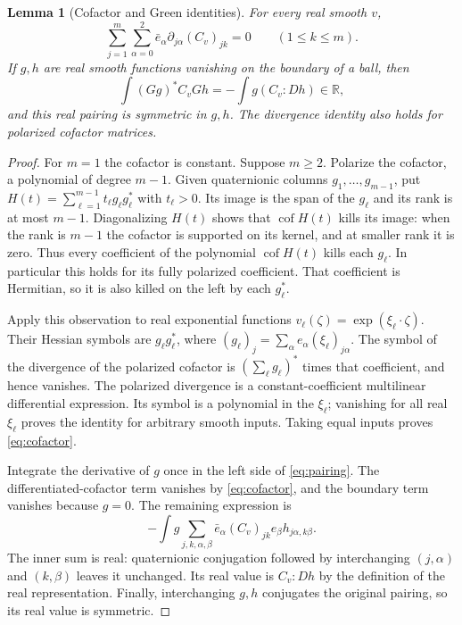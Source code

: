 \documentclass[11pt]{article}
\newtheorem{lemma}{Lemma}
\numberwithin{equation}{section}
\newcommand{\R}{\mathbb R}
\DeclareMathOperator{\cof}{cof}
\begin{document}
\begin{lemma}[Cofactor and Green identities]\label{lem:cofactor}
For every real smooth $v$,
\begin{equation}\label{eq:cofactor}
 \sum_{j=1}^m\sum_{\alpha=0}^2
       \bar e_\alpha\partial_{j\alpha}(C_v)_{jk}=0
       \qquad(1\le k\le m).
\end{equation}
If $g,h$ are real smooth functions vanishing on the boundary of a ball,
then
\begin{equation}\label{eq:pairing}
 \int (Gg)^*C_vGh=-\int g(C_v:Dh)\in\R,
\end{equation}
and this real pairing is symmetric in $g,h$.
The divergence identity also holds for polarized cofactor matrices.
\end{lemma}
\begin{proof}
For $m=1$ the cofactor is constant. Suppose $m\ge2$.
Polarize the cofactor, a polynomial of degree $m-1$.
Given quaternionic columns $g_1,\ldots,g_{m-1}$, put
$H(t)=\sum_{\ell=1}^{m-1}t_\ell g_\ell g_\ell^*$ with $t_\ell>0$.
Its image is the span of the $g_\ell$ and its rank is at most $m-1$.
Diagonalizing $H(t)$ shows that $\cof H(t)$ kills its image:
when the rank is $m-1$ the cofactor is supported on its kernel,
and at smaller rank it is zero.
Thus every coefficient of the polynomial $\cof H(t)$ kills each
$g_\ell$. In particular this holds for its fully polarized coefficient.
That coefficient is Hermitian, so it is also killed on the left by
each $g_\ell^*$.

Apply this observation to real exponential functions
$v_\ell(\zeta)=\exp(\xi_\ell\cdot\zeta)$.
Their Hessian symbols are $g_\ell g_\ell^*$, where
$(g_\ell)_j=\sum_\alpha e_\alpha(\xi_\ell)_{j\alpha}$.
The symbol of the divergence of the polarized cofactor is
$(\sum_\ell g_\ell)^*$ times that coefficient, and hence vanishes.
The polarized divergence is a constant-coefficient multilinear
differential expression. Its symbol is a polynomial in the
$\xi_\ell$; vanishing for all real $\xi_\ell$ proves the identity
for arbitrary smooth inputs. Taking equal inputs proves
\eqref{eq:cofactor}.

Integrate the derivative of $g$ once in the left side of
\eqref{eq:pairing}. The differentiated-cofactor term vanishes by
\eqref{eq:cofactor}, and the boundary term vanishes because $g=0$.
The remaining expression is
\[
 -\int g\sum_{j,k,\alpha,\beta}
         \bar e_\alpha(C_v)_{jk}e_\beta h_{j\alpha,k\beta}.
\]
The inner sum is real: quaternionic conjugation followed by
interchanging $(j,\alpha)$ and $(k,\beta)$ leaves it unchanged.
Its real value is $C_v:Dh$ by the definition of the real
representation. Finally, interchanging $g,h$ conjugates the original
pairing, so its real value is symmetric.
\end{proof}
\end{document}
